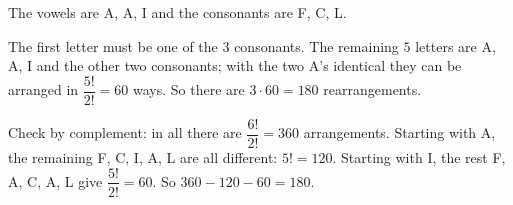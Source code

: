The vowels are A, A, I and the consonants are F, C, L.

The first letter must be one of the $3$ consonants. The remaining $5$ letters are A, A, I and the other two consonants; with the two A's identical they can be arranged in $\dfrac{5!}{2!}=60$ ways. So there are $3\cdot60=\boxed{180}$ rearrangements.

Check by complement: in all there are $\dfrac{6!}{2!}=360$ arrangements. Starting with A, the remaining F, C, I, A, L are all different: $5!=120$. Starting with I, the rest F, A, C, A, L give $\dfrac{5!}{2!}=60$. So $360-120-60=180$.
